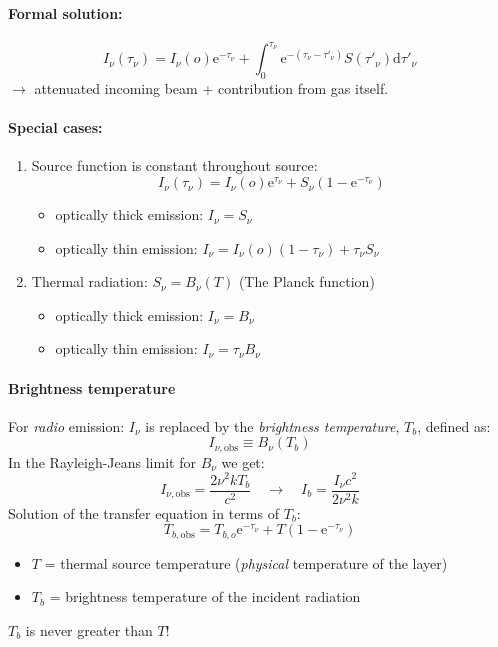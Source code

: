 \documentclass[11pt]{article}
\newcommand{\mar}[1]{\hspace{0pt}\marginpar{-\textcolor{black}{#1}-}}
\begin{document}
\paragraph{Formal solution:}
\[
    I_{\nu}(\tau_{\nu}) = I_{\nu}(o)\mathrm{e}^{-\tau_{\nu}} +
        \int_{0}^{\tau_{\nu}}\!{\mathrm{e}^{-(\tau_{\nu}-\tau'_{\nu})}
        S(\tau'_{\nu})\mathrm{d}\tau'_{\nu}}
        \]
\mar{27}$\rightarrow$ attenuated incoming beam + contribution from gas itself.

\paragraph{Special cases:}
\begin{enumerate}
    \item Source function is constant throughout source:
        \[
            I_{\nu}(\tau_{\nu}) =
            I_{\nu}(o)\mathrm{e}^{\tau_{\nu}}
            + S_{\nu}(1-\mathrm{e}^{-\tau_{\nu}})
            \]
        \begin{itemize}[itemsep=1ex]
            \item optically thick emission:
                $I_{\nu}=S_{\nu}$
            \item optically thin emission:
                $I_{\nu}=I_{\nu}(o)(1-\tau_{\nu}) + \tau_{\nu}S_{\nu}$
        \end{itemize}
    \item Thermal radiation: $S_{\nu} = B_{\nu}(T) $ (The Planck function)
        \begin{itemize}[itemsep=1ex]
            \item optically thick emission:
                $I_{\nu}=B_{\nu}$
            \item optically thin emission:
                $I_{\nu}=\tau_{\nu}B_{\nu}$
        \end{itemize}
\end{enumerate}

\paragraph{Brightness temperature}
For \emph{radio} emission:
$I_{\nu}$ is replaced by the \textit{brightness temperature},
$T_{b}$, defined as:
\[
    I_{\nu,\mathrm{obs}} \equiv B_{\nu}(T_b)
    \]
In the Rayleigh-Jeans limit for $B_{\nu}$ we get:
\[
    I_{\nu,\mathrm{obs}} = \frac{2\nu^{2}kT_{b}}{c^{2}}
    \quad\longrightarrow\quad
    I_{b} = \frac{I_{\nu}c^{2}}{2\nu^{2}k}
    \]
Solution of the transfer equation in terms of $T_{b}$:
\[
    T_{b,\mathrm{obs}} =
    T_{b,o}\mathrm{e}^{-\tau_{\nu}}
    + T(1-\mathrm{e}^{-\tau_{\nu}})
    \]
\begin{itemize}[label={}, noitemsep]
    \item \mar{28}$T$ = thermal source temperature (\emph{physical}
        temperature of the layer)
    \item $T_{b}$ = brightness temperature of the incident radiation
\end{itemize}
\textcolor{bred}{$T_{b}$ is never greater than $T$!}
\end{document}
